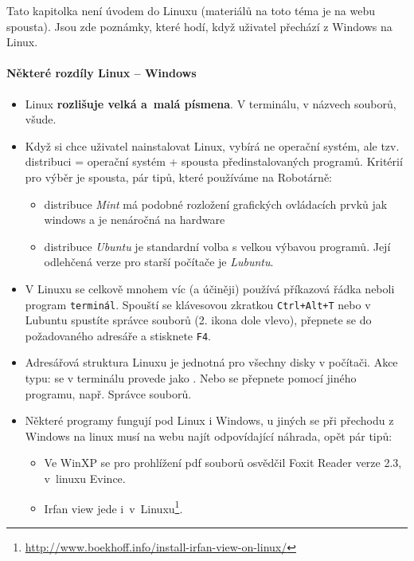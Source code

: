 Tato kapitolka není úvodem do Linuxu (materiálů na toto téma je na webu spousta).  Jsou zde poznámky, které hodí, když uživatel přechází z Windows na Linux. 

\paragraph{Některé rozdíly Linux -- Windows}

\begin{itemize}

\item Linux {\bf rozlišuje velká a~malá písmena}. V terminálu, v názvech souborů, všude. 

\item Když si chce uživatel nainstalovat Linux, vybírá ne operační systém, ale tzv. distribuci = operační systém + spousta předinstalovaných programů. Kritérií pro výběr je spousta, pár tipů, které používáme na Robotárně: 

	\begin{itemize}
		\item distribuce {\it Mint} má podobné rozložení grafických ovládacích prvků jak windows a je nenáročná na hardware 
	
		\item distribuce {\it Ubuntu} je standardní volba s velkou výbavou programů. Její odlehčená verze pro starší počítače je {\it Lubuntu}. 
	
	\end{itemize}  

\item V Linuxu se celkově mnohem víc (a účiněji) používá příkazová řádka neboli program  {\tt terminál}.  Spouští se klávesovou zkratkou {\tt Ctrl+Alt+T} nebo v Lubuntu spustíte správce souborů (2. ikona dole vlevo), přepnete se do požadovaného adresáře a stisknete {\tt F4}. \label{terminal}

\item Adresářová struktura Linuxu je jednotná pro všechny disky v počítači. Akce typu: {\it {} } se v terminálu provede jako {\it {} }. Nebo se přepnete pomocí jiného programu, např. Správce souborů. 	
	
\item Některé programy fungují pod Linux i Windows, u jiných se při přechodu z Windows na linux musí na webu najít odpovídající náhrada, opět pár tipů: 

	\begin{itemize}
		\item Ve WinXP se pro prohlížení pdf souborů osvědčil Foxit Reader verze 2.3, v~linuxu Evince.  
			
		\item Irfan view jede i~v~Linuxu\footnote{\url{http://www.boekhoff.info/install-irfan-view-on-linux/}}.
	
	\end{itemize}

	
\end{itemize}



